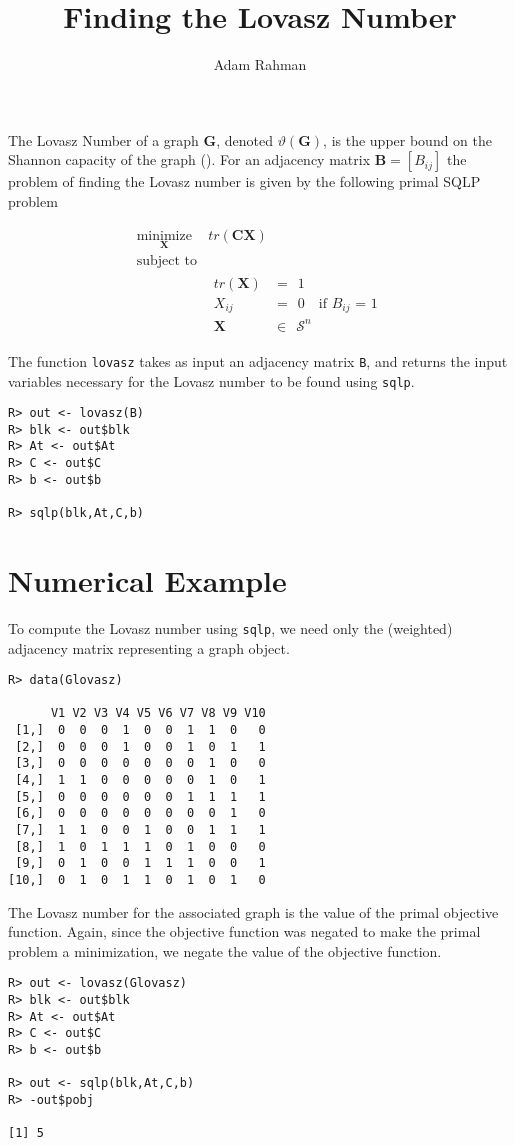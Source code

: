 \documentclass{article}
\author{Adam Rahman}
\title{Finding the Lovasz Number}
\newcommand{\m}[1]{\mathbf{#1}}               %
\begin{document}
\maketitle

The Lovasz Number of a graph $\m{G}$, denoted $\vartheta(\m{G})$, is the upper bound on the Shannon capacity of the graph (\cite{lovasz1979shannon}). For an adjacency matrix $\m{B} = [B_{ij}]$ the problem of finding the Lovasz number is given by the following primal SQLP problem

\[
\begin{array}{ll}
\underset{\m{X}}{\text{minimize}} & tr(\m{C}\m{X}) \\
\text{subject to} & \\
& \begin{array}{rl}
tr(\m{X}) & = ~~1 \\
X_{ij} &=~~ 0 \quad \text{if $B_{ij}$ = 1} \\
\m{X} &\in~~ \mathcal{S}^{n}
\end{array}
\end{array}
\]

The function \verb!lovasz! takes as input an adjacency matrix \verb!B!, and returns the input variables necessary for the Lovasz number to be found using \verb!sqlp!.

\begin{verbatim}
R> out <- lovasz(B)
R> blk <- out$blk
R> At <- out$At
R> C <- out$C
R> b <- out$b

R> sqlp(blk,At,C,b)
\end{verbatim}

\section*{Numerical Example}

To compute the Lovasz number using \verb!sqlp!, we need only the (weighted) adjacency matrix representing a graph object.

\begin{verbatim}
R> data(Glovasz)

      V1 V2 V3 V4 V5 V6 V7 V8 V9 V10
 [1,]  0  0  0  1  0  0  1  1  0   0
 [2,]  0  0  0  1  0  0  1  0  1   1
 [3,]  0  0  0  0  0  0  0  1  0   0
 [4,]  1  1  0  0  0  0  0  1  0   1
 [5,]  0  0  0  0  0  0  1  1  1   1
 [6,]  0  0  0  0  0  0  0  0  1   0
 [7,]  1  1  0  0  1  0  0  1  1   1
 [8,]  1  0  1  1  1  0  1  0  0   0
 [9,]  0  1  0  0  1  1  1  0  0   1
[10,]  0  1  0  1  1  0  1  0  1   0
\end{verbatim}

The Lovasz number for the associated graph is the value of the primal objective function. Again, since the objective function was negated to make the primal problem a minimization, we negate the value of the objective function.

\begin{verbatim}
R> out <- lovasz(Glovasz)
R> blk <- out$blk
R> At <- out$At
R> C <- out$C
R> b <- out$b

R> out <- sqlp(blk,At,C,b)
R> -out$pobj

[1] 5
\end{verbatim}



\end{document}
